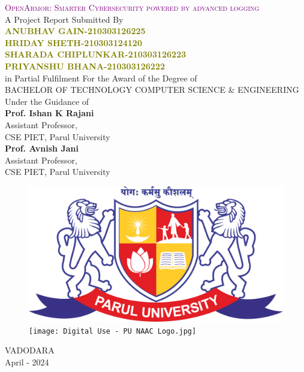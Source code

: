 \thispagestyle{empty}
\begin{center}
\textcolor{purple}{{\huge \textsc{OpenArmor: Smarter Cybersecurity powered by advanced logging} }}\\
\vspace{0.5cm}
A Project Report
Submitted By\\

\textcolor{olive}{\huge \bf ANUBHAV GAIN-210303126225}\\ 
\textcolor{olive}{\huge \bf HRIDAY SHETH-210303124120}\\  
\textcolor{olive}{\huge \bf SHARADA CHIPLUNKAR-210303126223}\\ 
\textcolor{olive}{\huge \bf PRIYANSHU BHANA-210303126222}\\ 

\vspace{0.4cm}
in Partial Fulfilment For the Award of
the Degree of\\
BACHELOR OF TECHNOLOGY
COMPUTER SCIENCE \& ENGINEERING\\
Under the Guidance of\\
\large{\textbf{Prof. Ishan K Rajani}}\\
Assistant Professor, \\
CSE
PIET,  Parul University \\
\large{\textbf{Prof. Avnish Jani}}\\
Assistant Professor, \\
CSE
PIET,  Parul University \\

\vspace{0.3cm}
\begin{figure}[h]
\begin{center}
     \includegraphics[scale=0.18]{parullogo.png} \\
     \vspace{0.7cm}
     \texttt{[image: Digital Use - PU NAAC Logo.jpg]}
\end{center}
\end{figure}
VADODARA\\
April - 2024
\end{center}
